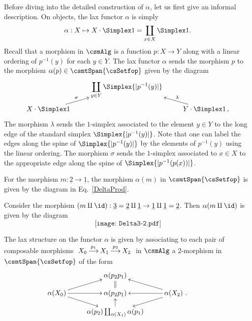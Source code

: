 \documentclass[a4paper]{article}
\numberwithin{equation}{section}
\begin{document}
Before diving into the detailed construction of $\alpha$, let us first give an informal description. On objects, the lax functor $\alpha$ is simply 
\begin{equation*}
\alpha:X\mapsto X\cdot \Simplex 1 = \coprod_{x \in X} \Simplex 1.
\end{equation*}
Recall that a morphism in $\csmAlg$ is a function $p:X \to Y$ along with a linear ordering of $p^{-1}(y)$ for each $y \in Y$. The lax functor $\alpha$ sends the morphism $p$ to the morphism $\alpha(p) \in \csmtSpan{\csSetfop}$ given by the diagram
\begin{equation*}
 \xymatrixrowsep{.8pc}\xymatrix{ & \displaystyle \coprod_{y \in Y} \Simplex{|p^{-1}(y)|} & \\
 X\cdot \Simplex 1 \ar[ru]^-{\sigma} & & \ar[lu]_-{\lambda} Y\cdot \Simplex 1 \, ,}
\end{equation*}
The morphism $\lambda$ sends the $1$-simplex associated to the element $y \in Y$ to the long edge of the standard simplex $\Simplex{|p^{-1}(y)|}$. Note that one can label the edges along the spine of $\Simplex{|p^{-1}(y)|}$ by the elements of $p^{-1}(y)$ using the linear ordering. The morphism $\sigma$ sends the $1$-simplex associated to $x \in X$ to the appropriate edge along the spine of $\Simplex{|p^{-1}(p(x))|}$. 

\begin{exam}
For the morphism $m:\underline{2} \to \underline{1}$, the morphism $\alpha(m)$ in $\csmtSpan{\csSetfop}$ is given by the diagram in Eq.~\ref{DeltaProd}.
\end{exam}
\begin{exam}
  Consider the morphism $(m \amalg \id):\underline{3} = \underline{2} \amalg \underline{1} \to \underline{1} \amalg \underline{1} = \underline{2}$. Then $\alpha(m \amalg \id)$ is given by the diagram
  \begin{equation*}
   \texttt{[image: Delta3-2.pdf]} 
  \end{equation*}
\end{exam}

The lax structure on the functor $\alpha$ is given by associating to each pair of composable morphisms $\xymatrixcolsep{1.1pc}\xymatrix{X_0 \ar[r]^-{p_1} & X_1 \ar[r]^-{p_2} & X_2}$ in $\csmAlg$ a $2$-morphism in $\csmtSpan{\csSetfop}$ of the form
\begin{equation*}
 \xymatrixrowsep{.8pc}\xymatrix{ & \alpha(p_2p_1) \ar@{=}[d] & \\
 \alpha(X_0) \ar[ru] \ar[rd] \ar[r] & \alpha(p_2p_1) & \alpha(X_2) \ . \ar[lu] \ar[ld] \ar[l] & \\
  & \alpha(p_2) \coprod_{\alpha(X_1)} \alpha(p_1) \ar[u] & }
\end{equation*}
\end{document}
